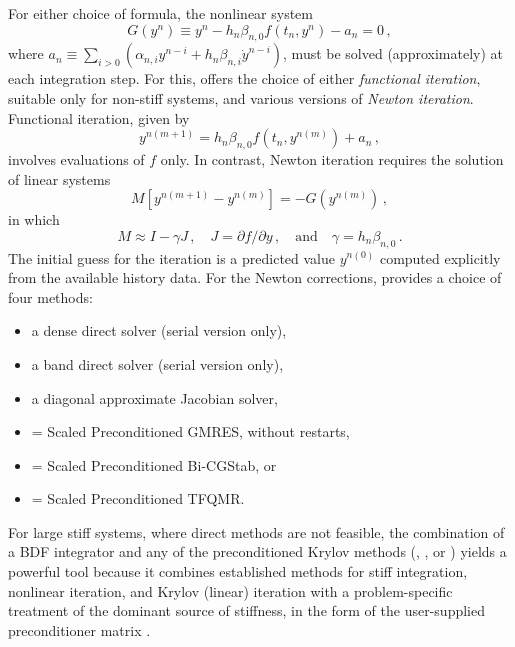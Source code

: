 For either choice of formula, the nonlinear system
\begin{equation}\label{e:nonlinear}
  G(y^n) \equiv y^n - h_n \beta_{n,0} f(t_n,y^n) - a_n = 0 \, ,
\end{equation}
where $a_n\equiv\sum_{i>0}(\alpha_{n,i}y^{n-i}+h_n\beta_{n,i}{{\dot y}}^{n-i})$, 
must be solved (approximately) at each integration step.  For this, {\cvodes}
offers the choice of either {\em functional iteration}, suitable only
for non-stiff systems, and various versions of {\em Newton iteration}.
Functional iteration, given by
\[ y^{n(m+1)} = h_n \beta_{n,0} f(t_n,y^{n(m)}) + a_n \, , \]
involves evaluations of $f$ only.  In contrast, Newton iteration requires
the solution of linear systems
\begin{equation}\label{e:Newton}
  M [y^{n(m+1)} - y^{n(m)}] = -G(y^{n(m)}) \, ,
\end{equation}
in which
\begin{equation}\label{e:Newtonmat} 
  M \approx I - \gamma J \, ,
  \quad J = \partial f / \partial y \, ,
  \quad \mbox{and} \quad
  \gamma = h_n \beta_{n,0} \, . 
\end{equation}
The initial guess for the iteration is a predicted value $y^{n(0)}$
computed explicitly from the available history data.
For the Newton corrections, {\cvodes} provides a choice of four methods:
\begin{itemize}
\item a dense direct solver (serial version only),
\item a band direct solver (serial version only),
\item a diagonal approximate Jacobian solver,
\item {\spgmr} = Scaled Preconditioned GMRES, without restarts,
\item {\spbcg} = Scaled Preconditioned Bi-CGStab, or
\item {\sptfqmr} = Scaled Preconditioned TFQMR.
\end{itemize}
For large stiff systems, where direct methods are not feasible, the
combination of a BDF integrator and any of the preconditioned Krylov
methods ({\spgmr}, {\spbcg}, or {\sptfqmr}) yields a powerful tool
because it combines established methods for stiff integration,
nonlinear iteration, and Krylov (linear) iteration with a
problem-specific treatment of the dominant source of stiffness, in the
form of the user-supplied preconditioner matrix \cite{BrHi:89}.

